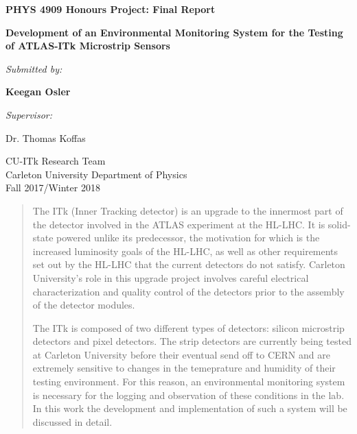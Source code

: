 \documentclass[letterpaper, 11pt]{report}
\begin{document}
\begin{titlepage}
\begin{center}

\begin{spacing}{1.5}
\textbf{PHYS 4909 Honours Project: Final Report}\\
\vspace*{\fill}
\end{spacing}
\begin{spacing}{2.0}
\textbf{\huge Development of an Environmental Monitoring System for the Testing of ATLAS-ITk Microstrip Sensors}\\[0.5cm]
\vspace*{\fill}
\end{spacing}

\begin{spacing}{1.5}
\textit{Submitted by:}

\textbf{\large Keegan Osler}

\vspace*{\fill}
\textit{Supervisor:}

\textnormal{\large Dr. Thomas Koffas}

\vspace*{\fill}

\textnormal{\large CU-ITk Research Team \\ Carleton University Department of Physics \\ Fall 2017/Winter 2018}

\end{spacing}
\end{center}
\end{titlepage}


\begin{abstract}
The ITk (Inner Tracking detector) is an upgrade to the innermost part of the detector involved in the ATLAS experiment at the HL-LHC.  It is solid-state powered unlike its predecessor, the motivation for which is the increased luminosity goals of the HL-LHC, as well as other requirements set out by the HL-LHC that the current detectors do not satisfy.  Carleton University's role in this upgrade project involves careful electrical characterization and quality control of the detectors prior to the assembly of the detector modules.

The ITk is composed of two different types of detectors: silicon microstrip detectors and pixel detectors.  The strip detectors are currently being tested at Carleton University before their eventual send off to CERN and are extremely sensitive to changes in the temeprature and humidity of their testing environment.  For this reason, an environmental monitoring system is necessary for the logging and observation of these conditions in the lab.  In this work the development and implementation of such a system will be discussed in detail.
\end{abstract}
\end{document}
